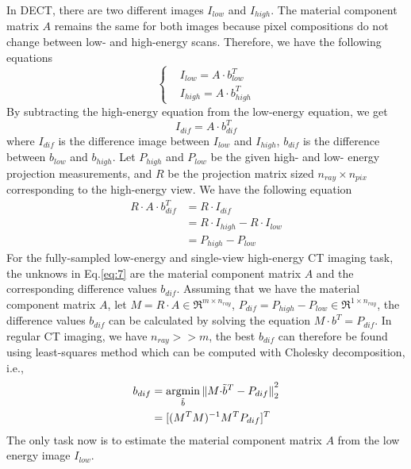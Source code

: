 \documentclass[journal,twoside,web]{ieeecolor}
\begin{document}
In DECT, there are two different images \(I_{low}\) and \(I_{high}\). The material component matrix \(A\) remains the same for both images because pixel compositions do not change between low- and high-energy scans. Therefore, we have the following equations
\begin{equation}
    \begin{cases}
        &I_{low}=A\cdot{b}_{low}^T\\
        &I_{high}=A\cdot{b}_{high}^T
    \end{cases}
    \label{eq:5}
\end{equation}
By subtracting the high-energy equation from the low-energy equation, we get
\begin{equation}
    I_{dif}=A\cdot{b}_{dif}^T
    \label{eq:6}
\end{equation}
where \(I_{dif}\) is the difference image between \(I_{low}\) and \(I_{high}\), \(b_{dif}\) is the difference between \(b_{low}\) and \(b_{high}\). Let \(P_{high}\) and \(P_{low}\) be the given high- and low- energy projection measurements, and \(R\) be the projection matrix sized \(n_{ray}{\times}n_{pix}\) corresponding to the high-energy view. We have the following equation
\begin{equation}
\begin{split}
    R{\cdot}A\cdot{b}_{dif}^T & = R{\cdot}I_{dif} \\
                               & = R{\cdot}I_{high}-R{\cdot}I_{low} \\
                               & = P_{high}-P_{low}
    \label{eq:7}
\end{split}
\end{equation}
For the fully-sampled low-energy and single-view high-energy CT imaging task, the unknows in Eq.\eqref{eq:7} are the material component matrix \(A\) and the corresponding difference values \(b_{dif}\). Assuming that we have the material component matrix \(A\), let \(M=R{\cdot}A\in\Re^{m{\times}n_{ray}}\), \(P_{dif}=P_{high}-P_{low}\in\Re^{1{\times}n_{ray}}\), the difference values \(b_{dif}\) can be calculated by solving the equation \(M{\cdot}b^{T}=P_{dif}\). In regular CT imaging, we have \(n_{ray}>>m\), the best \(b_{dif}\) can therefore be found using least-squares method which can be computed with Cholesky decomposition, i.e.,
\begin{equation}
\begin{split}
    b_{dif} & =\operatornamewithlimits{argmin}\limits_{\tilde{b}}{\|M{\cdot}\tilde{b}^T-P_{dif}\|}_2^2 \\
            & =[(M^TM)^{-1}M^TP_{dif}]^T
    \label{eq:8}
\end{split}
\end{equation}
The only task now is to estimate the material component matrix \(A\) from the low energy image \(I_{low}\).
\end{document}

